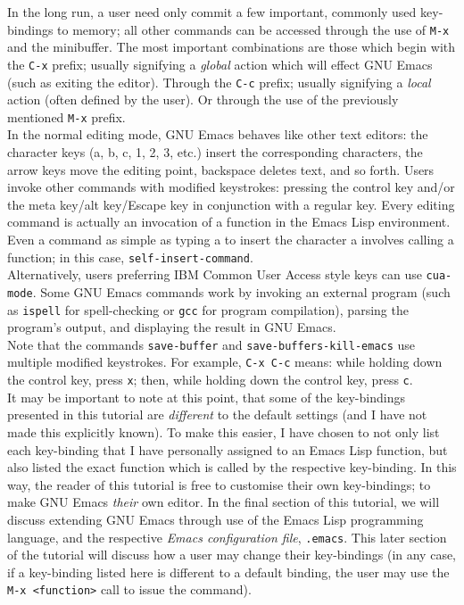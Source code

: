 \documentclass[12pt,a4paper,oneside]{article}
\begin{document}
In the long run, a user need only commit a few important, commonly used key-bindings to memory; all other commands can be accessed through the use of \texttt{M-x} and the minibuffer. The most important combinations are those which begin with the \texttt{C-x} prefix; usually signifying a \emph{global} action which will effect GNU Emacs (such as exiting the editor). Through the \texttt{C-c} prefix; usually signifying a \emph{local} action (often defined by the user). Or through the use of the previously mentioned \texttt{M-x} prefix.\\

In the normal editing mode, GNU Emacs behaves like other text editors: the character keys (a, b, c, 1, 2, 3, etc.) insert the corresponding characters, the arrow keys move the editing point, backspace deletes text, and so forth. Users invoke other commands with modified keystrokes: pressing the control key and/or the meta key/alt key/Escape key in conjunction with a regular key. Every editing command is actually an invocation of a function in the Emacs Lisp environment. Even a command as simple as typing a to insert the character a involves calling a function; in this case, \texttt{self-insert-command}.\\

Alternatively, users preferring IBM Common User Access style keys can use \texttt{cua-mode}. Some GNU Emacs commands work by invoking an external program (such as \texttt{ispell} for spell-checking or \texttt{gcc} for program compilation), parsing the program's output, and displaying the result in GNU Emacs.\\

Note that the commands \texttt{save-buffer} and \texttt{save-buffers-kill-emacs} use multiple modified keystrokes. For example, \texttt{C-x C-c} means: while holding down the control key, press \texttt{x}; then, while holding down the control key, press \texttt{c}.\\

It may be important to note at this point, that some of the key-bindings presented in this tutorial are \emph{different} to the default settings (and I have not made this explicitly known). To make this easier, I have chosen to not only list each key-binding that I have personally assigned to an Emacs Lisp function, but also listed the exact function which is called by the respective key-binding. In this way, the reader of this tutorial is free to customise their own key-bindings; to make GNU Emacs \emph{their} own editor. In the final section of this tutorial, we will discuss extending GNU Emacs through use of the Emacs Lisp programming language, and the respective \emph{Emacs configuration file}, \texttt{.emacs}. This later section of the tutorial will discuss how a user may change their key-bindings (in any case, if a key-binding listed here is different to a default binding, the user may use the \texttt{M-x <function>} call to issue the command).
\end{document}
